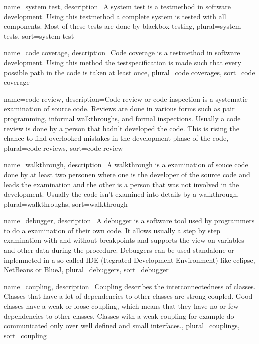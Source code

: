 {
	name={system test},
	description={A system test is a testmethod in software development.
		Using this testmethod a complete system is tested with all
		components. Most of these tests are done by
		\gls{blackbox testing}},
	plural={system tests},
	sort={system test}
}

{
	name={code coverage},
	description={Code coverage is a testmethod in software development.
		Using this method the testspecification is made such that
		every possible path in the code is taken at least once},
	plural={code coverages},
	sort={code coverage}
}

{
	name={code review},
	description={Code review or code inspection is a systematic
		examination of source code. Reviews are done in various 
		forms such as pair programming, informal walkthroughs, 
		and formal inspections. Usually a code review is done
		by a person that hadn't developed the code. This is rising
		the chance to find overlooked mistakes in the development
		phase of the code},
	plural={code reviews},
	sort={code review}
}

{
	name=walkthrough,
	description={A walkthrough is a examination of souce code done by
		at least two personen where one is the developer of the 
		source code and leads the examination and the other is a
		person that was not involved in the development. Usually
		the code isn't examined into details by a walkthrough},
	plural=walkthroughs,
	sort=walkthrough
}

{
	name=debugger,
	description={A debugger is a software tool used by programmers to
		do a examination of their own code. It allows usually a 
		step by step examination with and without breakpoints and
		supports the view on variables and other data during the
		procedure. Debuggers can be used standalone or inplemneted
		in a so called IDE (Itegrated Development Environment) like
		eclipse, NetBeans or BlueJ},
	plural=debuggers,
	sort=debugger
}

{
	name=coupling,
	description={Coupling describes the interconnectedness
		of classes. Classes that have a lot of dependencies to
		other classes are strong coupled. Good classes have a
		weak or loose coupling, which means that they have
		no or few dependencies to other classes. Classes with
		a weak coupling for example do communicated only over
		well defined and small interfaces.},
	plural=couplings,
	sort=coupling
}

